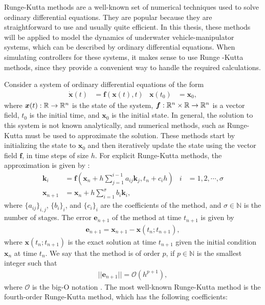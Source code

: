 Runge-Kutta methods are a well-known set of numerical techniques used to solve
ordinary differential equations. They are popular because they are
straightforward to use and usually quite efficient. In this thesis, these
methods will be applied to model the dynamics of underwater vehicle-manipulator
systems, which can be described by ordinary differential equations.
When simulating controllers for these systems, it makes sense to use Runge
-Kutta methods, since they provide a convenient way to handle the required
calculations.

Consider a system of ordinary differential equations of the form
\begin{align}
    \dot{\bm{x}}(t) &= \bm{f}(\bm{x}(t), t) & \bm{x}(t_0) &= \bm{x}_0,
\end{align}
where $\bm{x}(t) : \mathbb{R} \to \mathbb{R}^n$ is the state of the system,
$\bm{f} : \mathbb{R}^n \times \mathbb{R} \to \mathbb{R}^n$ is a vector field, $t_0$ is the initial time,
and $\bm{x}_0$ is the initial state. In general, the solution to this system is
not known analytically, and numerical methods, such as Runge-Kutta must be used
to approximate the solution. These methods start by initializing the state to
$\bm{x}_0$ and then iteratively update the state using the vector field $\bm{f}$,
in time steps of size $h$. For explicit Runge-Kutta methods, the approximation
is given by \cite{modsim}:
\begin{subequations}
    \begin{align}
        \bm{k}_i &= \bm{f}(\bm{x}_n + h \sum_{j=1}^{i-1} a_{ij}\bm{k}_j, t_n + c_i h) &
            i &= 1, 2, \cdots, \sigma \\
        \bm{x}_{n+1} &= \bm{x}_n + h \sum_{i=1}^{\sigma} b_i \bm{k}_i,
    \end{align}
\end{subequations}
where $\{a_{ij}\}_{i,j}$, $\{b_i\}_i$, and $\{c_i\}_i$ are the coefficients of
the method, and $\sigma \in \mathbb{N}$ is the number of stages. The error $\bm{e}_{n+1}$ of
the method at time $t_{n+1}$ is given by
\begin{align}
    \bm{e}_{n+1} = \bm{x}_{n+1} - \bm{x}(t_n;t_{n+1}),
\end{align}
where $\bm{x}(t_n;t_{n+1})$ is the exact solution at time $t_{n+1}$ given the
initial condition $\bm{x}_n$ at time $t_n$. We say that the method is of order
$p$, if $p \in \mathbb{N}$ is the smallest integer such that
\begin{align}
    ||\bm{e}_{n+1}|| = \mathcal{O}(h^{p+1}),
\end{align}
where $\mathcal{O}$ is the big-O notation \cite{modsim}.
The most well-known Runge-Kutta method is the fourth-order Runge-Kutta method,
which has the following coefficients:

